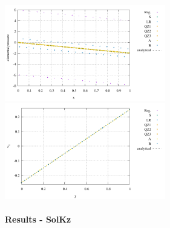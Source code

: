 \begin{center}
\includegraphics[width=7cm]{python_codes/fieldstone_78/results/mms_cavity/32x32/prop}
\includegraphics[width=7cm]{python_codes/fieldstone_78/results/mms_cavity/32x32/vel_profile}
\end{center}


\newpage
\paragraph{Results - SolKz}

